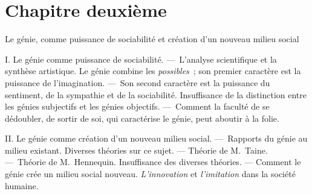 \documentclass[french,twoside]{book} %
\newcommand\chapteropen{} %
\newcommand\chaptercont{} %
\begin{document}
\chapteropen
\chapter[{Chapitre deuxième}]{Chapitre deuxième}\renewcommand{\leftmark}{Chapitre deuxième}

\begin{center}Le génie, comme puissance de sociabilité et création d’un nouveau milieu social\end{center}

\chaptercont
\noindent I. Le génie comme puissance de sociabilité. — L’analyse scientifique et la synthèse artistique. Le génie combine les \emph{possibles} ; son premier caractère est la puissance de l’imagination. — Son second caractère est la puissance du sentiment, de la sympathie et de la sociabilité. Insuffisance de la distinction entre les génies subjectifs et les génies objectifs. — Comment la faculté de se dédoubler, de sortir de soi, qui caractérise le génie, peut aboutir à la folie.\par
II. Le génie comme création d’un nouveau milieu social. — Rapports du génie au milieu existant. Diverses théories sur ce sujet. — Théorie de M. Taine. — Théorie de M. Hennequin. Insuffisance des diverses théories. — Comment le génie crée un milieu social nouveau. \emph{L’innovation} et \emph{l’imitation} dans la société humaine.\par
\par
\end{document}
